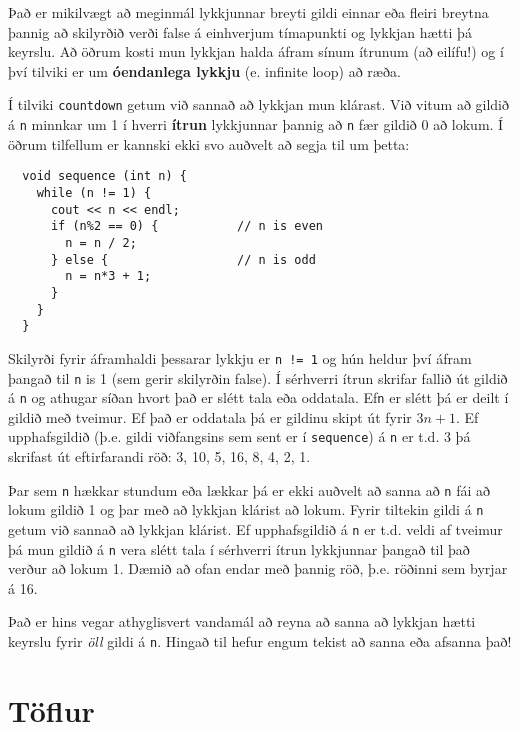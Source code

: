 
Það er mikilvægt að meginmál lykkjunnar breyti gildi einnar eða fleiri breytna þannig að skilyrðið verði false á einhverjum tímapunkti og lykkjan hætti þá keyrslu.
Að öðrum kosti mun lykkjan halda áfram sínum ítrunum (að eilífu!) og í því tilviki er um {\bf óendanlega lykkju} (e. infinite loop) að ræða.

Í tilviki {\tt countdown} getum við sannað að lykkjan mun klárast.
Við vitum að gildið á {\tt n} minnkar um 1 í hverri {\bf ítrun} lykkjunnar þannig að {\tt n} fær gildið 0 að lokum.
Í öðrum tilfellum er kannski ekki svo auðvelt að segja til um þetta:

\begin{verbatim}
  void sequence (int n) {
    while (n != 1) {
      cout << n << endl;
      if (n%2 == 0) {           // n is even
        n = n / 2;
      } else {                  // n is odd
        n = n*3 + 1;
      }
    }
  }
\end{verbatim}
%
Skilyrði fyrir áframhaldi þessarar lykkju er {\tt n != 1} og hún heldur því áfram þangað til {\tt n} is 1 (sem gerir skilyrðin false).
Í sérhverri ítrun skrifar fallið út gildið á {\tt n} og athugar síðan hvort það er slétt tala eða oddatala.
Ef{\tt n} er slétt þá er deilt í gildið með tveimur.
Ef það er oddatala þá er gildinu skipt út fyrir $3n+1$.
Ef upphafsgildið (þ.e. gildi viðfangsins sem sent er í {\tt sequence}) á {\tt n} er t.d. 3 þá skrifast út eftirfarandi röð:
3, 10, 5, 16, 8, 4, 2, 1.

Þar sem {\tt n} hækkar stundum eða lækkar þá er ekki auðvelt að sanna að {\tt n} fái að lokum gildið 1 og þar með að lykkjan klárist að lokum.
Fyrir tiltekin gildi á {\tt n} getum við sannað að lykkjan klárist.
Ef upphafsgildið á {\tt n} er t.d. veldi af tveimur þá mun gildið á {\tt n} vera slétt tala í sérhverri ítrun lykkjunnar þangað til það verður að lokum 1.
Dæmið að ofan endar með þannig röð, þ.e. röðinni sem byrjar á 16.

Það er hins vegar athyglisvert vandamál að reyna að sanna að lykkjan hætti keyrslu fyrir {\em öll} gildi á {\tt n}.
Hingað til hefur engum tekist að sanna eða afsanna það!

\section{Töflur}

